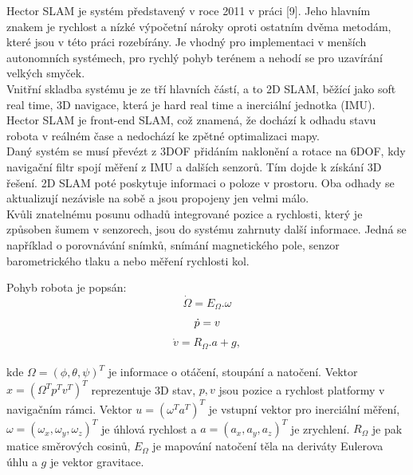 \documentclass[12pt]{report}
\begin{document}
Hector SLAM je systém představený v roce 2011 v práci [9]. Jeho hlavním znakem je rychlost a nízké výpočetní nároky oproti ostatním dvěma metodám, které jsou v této práci rozebírány. Je vhodný pro implementaci v menších autonomních systémech, pro rychlý pohyb terénem a nehodí se pro uzavírání velkých smyček.\\
\indent Vnitřní skladba systému je ze tří hlavních částí, a to 2D SLAM, běžící jako soft real time, 3D navigace, která je hard real time a inerciální jednotka (IMU). Hector SLAM je front-end SLAM, což znamená, že dochází k odhadu stavu robota v reálném čase a nedochází ke zpětné optimalizaci mapy.\\
\indent Daný systém se musí převézt z 3DOF přidáním naklonění a rotace na 6DOF, kdy navigační filtr spojí měření z IMU a dalších senzorů. Tím dojde k získání 3D řešení. 2D SLAM poté poskytuje informaci o poloze v prostoru. Oba odhady se aktualizují nezávisle na sobě a jsou propojeny jen velmi málo.\\
\indent Kvůli znatelnému posunu odhadů integrované pozice a rychlosti, který je způsoben šumem v senzorech, jsou do systému zahrnuty další informace. Jedná se například o porovnávání snímků, snímání magnetického pole, senzor barometrického tlaku a nebo měření rychlosti kol.

Pohyb robota je popsán:
\begin{equation}
	\dot{\Omega}=E_\Omega.\omega
\end{equation}
\begin{equation}
	\dot{p}=v\\
\end{equation}
\begin{equation}
	\dot{v}=R_\Omega.a+g,
\end{equation}\\
kde $\Omega=(\phi,\theta,\psi)^T$ je informace o otáčení, stoupání a natočení. Vektor $x=(\Omega^T p^T v^T)^T$ reprezentuje 3D stav, $p,v$ jsou pozice a rychlost platformy v navigačním rámci. Vektor $u=(\omega^T a^T)^T$ je vstupní vektor pro inerciální měření, $\omega=(\omega_x,\omega_y,\omega_z)^T$ je úhlová rychlost a $a=(a_x,a_y,a_z)^T$ je zrychlení. $R_\Omega$ je pak matice směrových cosinů, $E_\Omega$ je mapování natočení těla na deriváty Eulerova úhlu a $g$ je vektor gravitace.\\
\end{document}
